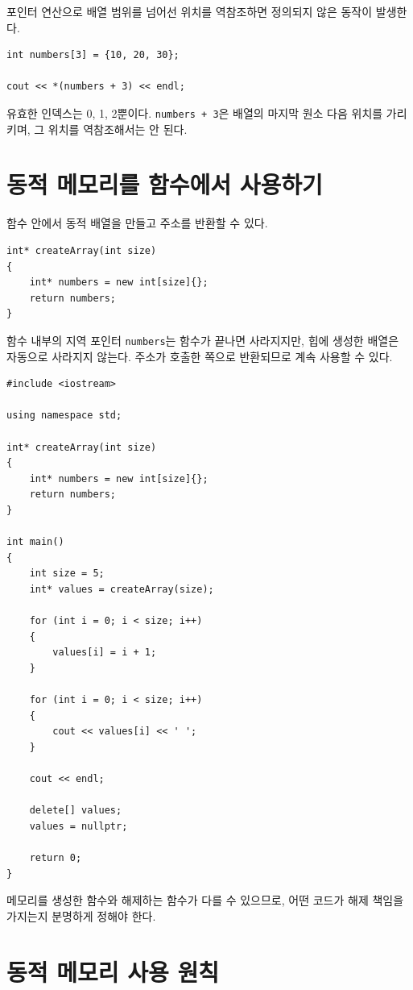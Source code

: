 \documentclass[11pt,a4paper]{article}
\begin{document}
포인터 연산으로 배열 범위를 넘어선 위치를 역참조하면 정의되지 않은 동작이 발생한다.

\begin{lstlisting}
int numbers[3] = {10, 20, 30};

cout << *(numbers + 3) << endl;
\end{lstlisting}

유효한 인덱스는 0, 1, 2뿐이다.
\texttt{numbers + 3}은 배열의 마지막 원소 다음 위치를 가리키며, 그 위치를 역참조해서는 안 된다.

\section{동적 메모리를 함수에서 사용하기}

함수 안에서 동적 배열을 만들고 주소를 반환할 수 있다.

\begin{lstlisting}
int* createArray(int size)
{
    int* numbers = new int[size]{};
    return numbers;
}
\end{lstlisting}

함수 내부의 지역 포인터 \texttt{numbers}는 함수가 끝나면 사라지지만, 힙에 생성한 배열은 자동으로 사라지지 않는다.
주소가 호출한 쪽으로 반환되므로 계속 사용할 수 있다.

\begin{lstlisting}
#include <iostream>

using namespace std;

int* createArray(int size)
{
    int* numbers = new int[size]{};
    return numbers;
}

int main()
{
    int size = 5;
    int* values = createArray(size);

    for (int i = 0; i < size; i++)
    {
        values[i] = i + 1;
    }

    for (int i = 0; i < size; i++)
    {
        cout << values[i] << ' ';
    }

    cout << endl;

    delete[] values;
    values = nullptr;

    return 0;
}
\end{lstlisting}

메모리를 생성한 함수와 해제하는 함수가 다를 수 있으므로, 어떤 코드가 해제 책임을 가지는지 분명하게 정해야 한다.

\section{동적 메모리 사용 원칙}
\end{document}
